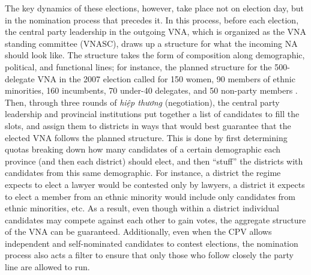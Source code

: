 \documentclass[12pt]{article}
\newcommand{\1}{\mathbbm{1}}
\begin{document}
The key dynamics of these elections, however, take place not on election day, but in the nomination process that precedes it. In this process, before each election, the central party leadership in the outgoing VNA, which is organized as the VNA standing committee (VNASC), draws up a structure for what the incoming NA should look like. The structure takes the form of composition along demographic, political, and functional lines; for instance, the planned structure for the 500-delegate VNA in the 2007 election called for 150 women, 90 members of ethnic minorities, 160 incumbents, 70 under-40 delegates, and 50 non-party members  \citep[506]{MaleskySchuler2011}. Then, through three rounds of \textit{hiệp thương} (negotiation), the central party leadership and provincial institutions put together a list of candidates to fill the slots, and assign them to districts in ways that would best guarantee that the elected VNA follows the planned structure. This is done by first determining quotas breaking down how many candidates of a certain demographic each province (and then each district) should elect, and then ``stuff'' the districts with candidates from this same demographic. For instance, a district the regime expects to elect a lawyer would be contested only by lawyers, a district it expects to elect a member from an ethnic minority would include only candidates from ethnic minorities, etc. As a result, even though within a district individual candidates may compete against each other to gain votes, the aggregate structure of the VNA can be guaranteed. Additionally, even when the CPV allows independent and self-nominated candidates to contest elections, the nomination process also acts a filter to ensure that only those who follow closely the party line are allowed to run.
\end{document}
